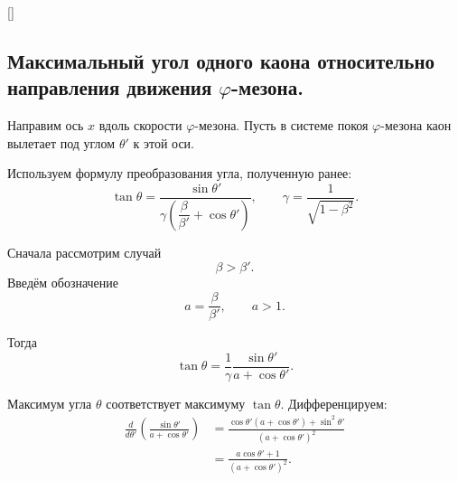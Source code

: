 \documentclass[../final.tex]{subfiles}
\begin{document}
\begin{rbox}[left=18pt,right=18pt,top=14pt,bottom=10pt]{[]}

    \captionsetup{
        font=footnotesize,
        labelfont=bf,
        skip=5pt
    }

    \label{fig:phi_to_kaons}
\end{rbox}


\subsection*{Максимальный угол одного каона относительно направления
движения $\varphi$-мезона.}

Направим ось $x$ вдоль скорости $\varphi$-мезона.
Пусть в системе покоя $\varphi$-мезона каон вылетает под углом
$\theta'$ к этой оси.

Используем формулу преобразования угла, полученную ранее:
%
\begin{equation*}
    \tan\theta
    =
    \frac{
        \sin\theta'
    }{
        \gamma
        \left(
            \dfrac{\beta}{\beta'}
            +
            \cos\theta'
        \right)
    },
    \qquad
    \gamma
    =
    \frac{1}{\sqrt{1-\beta^2}}.
\end{equation*}

Сначала рассмотрим случай
%
\begin{equation*}
    \beta>\beta'.
\end{equation*}
%
Введём обозначение
%
\begin{equation*}
    a
    =
    \frac{\beta}{\beta'},
    \qquad
    a>1.
\end{equation*}

Тогда
%
\begin{equation*}
    \tan\theta
    =
    \frac{1}{\gamma}
    \frac{
        \sin\theta'
    }{
        a+\cos\theta'
    }.
\end{equation*}

Максимум угла $\theta$ соответствует максимуму $\tan\theta$.
Дифференцируем:
%
\begin{align*}
    \frac{d}{d\theta'}
    \left(
        \frac{\sin\theta'}{a+\cos\theta'}
    \right)
    &=
    \frac{
        \cos\theta'(a+\cos\theta')
        +
        \sin^2\theta'
    }{
        (a+\cos\theta')^2
    }
    \\[3pt]
    &=
    \frac{
        a\cos\theta'+1
    }{
        (a+\cos\theta')^2
    }.
\end{align*}
\end{document}
